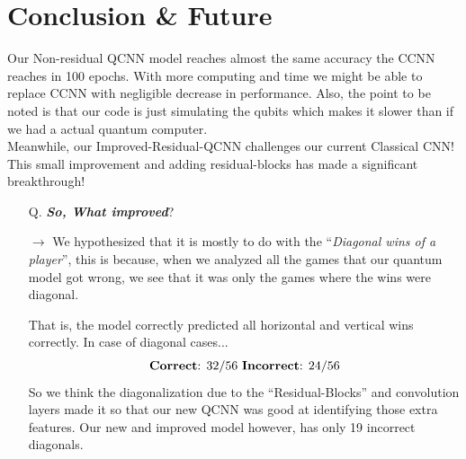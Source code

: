 \documentclass[a4paper]{article}
\begin{document}
\section*{Conclusion \& Future}

Our Non-residual QCNN model reaches almost the same accuracy the CCNN reaches in 100 epochs. With more computing and time we might be able to replace CCNN with negligible decrease in performance. Also, the point to be noted is that our code is just simulating the qubits which makes it slower than if we had a actual quantum computer.\\

Meanwhile, our Improved-Residual-QCNN challenges our current Classical CNN! This small improvement and adding residual-blocks has made a significant breakthrough!

\begin{itemize}
\item[Q.] \textbf{\emph{So, What improved}}?
\item[\textbf{$\rightarrow$}] We hypothesized that it is mostly to do with the ``\emph{Diagonal wins of a player}'', this is because, when we analyzed all the games that our quantum model got wrong, we see that it was only the games where the wins were diagonal.

That is, the model correctly predicted all horizontal and vertical wins correctly. In case of diagonal cases...
\[ \text{\textbf{Correct}: } 32/56 \text{ \textbf{Incorrect}: } 24/56 \]
So we think the diagonalization due to the ``Residual-Blocks'' and convolution layers made it so that our new QCNN was good at identifying those extra features. Our new and improved model however, has only 19 incorrect diagonals.
\end{itemize}
\end{document}
